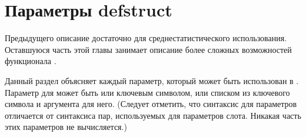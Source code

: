 \section{Параметры defstruct}
\label{DEFSTRUCT-OPTIONS}
\label{Defstruct-Hairy-Stuff}

Предыдущего описание  достаточно для среднестатистического
использования. Оставшуюся часть этой главы занимает описание более сложных
возможностей функционала .

Данный раздел объясняет каждый параметр, который может быть использован в
. Параметр для  может быть или ключевым символом,
или списком из ключевого символа и аргумента для него.  (Следует отметить, что
синтаксис для параметров  отличается от синтаксиса пар,
используемых для параметров слота. Никакая часть этих параметров не вычисляется.)

